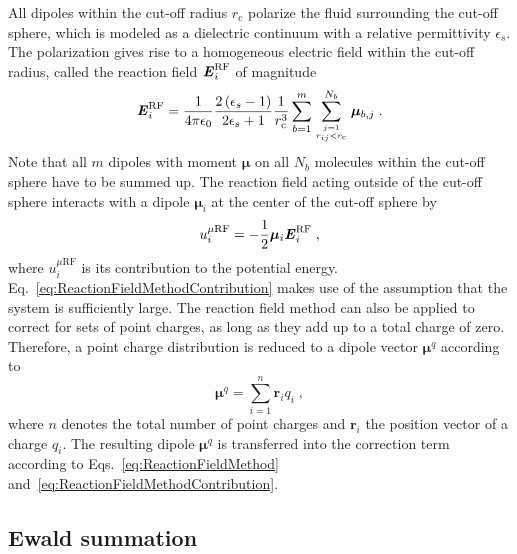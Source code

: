All dipoles within the cut-off radius $r_{\text{c}}$ polarize the fluid surrounding the cut-off sphere,
which is modeled as a dielectric continuum with a relative permittivity $\epsilon_{s}$. The polarization gives rise to a homogeneous electric field within the cut-off radius, called the reaction field $\textbf{\textit{E}}^{\text{RF}}_{i}$ of magnitude
\begin{equation}
\textbf{\textit{E}}^{\text{RF}}_{i}=\frac{1}{4\pi \epsilon_{0}} \frac{2\left(\epsilon_{s}-1\right)}{2\epsilon_{s}+1} \frac{1}{r^{3}_{\text{c}}} \sum^{m}_{b=1} \sum_{j=1 \atop r_{ij}<r_{\text{c}}}^{N_{b}} \boldsymbol \mu_{b,j} \;.
\label{eq:ReactionFieldMethod}
\end{equation}
Note that all $m$ dipoles with moment $\boldsymbol \mu$ on all $N_{b}$ molecules within the cut-off sphere have to be summed up.
The reaction field acting outside of the cut-off sphere interacts with a dipole $\boldsymbol \mu_{i}$ at the center of the cut-off sphere by \parencite{Allen,boettcher}
\begin{equation}
u_{i}^{\mu \text{RF}}=- \frac{1}{2} \boldsymbol \mu_{i} \textbf{\textit{E}}_{i}^{\text{RF}} \;,
\label{eq:ReactionFieldMethodContribution}
\end{equation}
where $u_{i}^{\mu \text{RF}}$ is its contribution to the potential energy. Eq.~\eqref{eq:ReactionFieldMethodContribution} makes use of the assumption that the system is sufficiently large. The reaction field method can also be applied to correct for sets of point charges, as long as they add up to a total charge of zero. Therefore, a point charge distribution is reduced to a dipole vector $\boldsymbol \mu^{q}$ according to
\begin{equation}
\boldsymbol \mu^{q}=\sum^{n}_{i=1} \boldsymbol r_{i} q_{i} \;,
\label{eq:ReactionFieldMethodPointCharges}
\end{equation}
where $n$ denotes the total number of point charges and $\boldsymbol r_{i}$ the position vector of a charge $q_{i}$. The resulting dipole $\boldsymbol \mu^{q}$ is transferred into the correction term according to Eqs.~\eqref{eq:ReactionFieldMethod} and~\eqref{eq:ReactionFieldMethodContribution}.


\subsection{Ewald summation}
\label{sec:Ewald summation}


